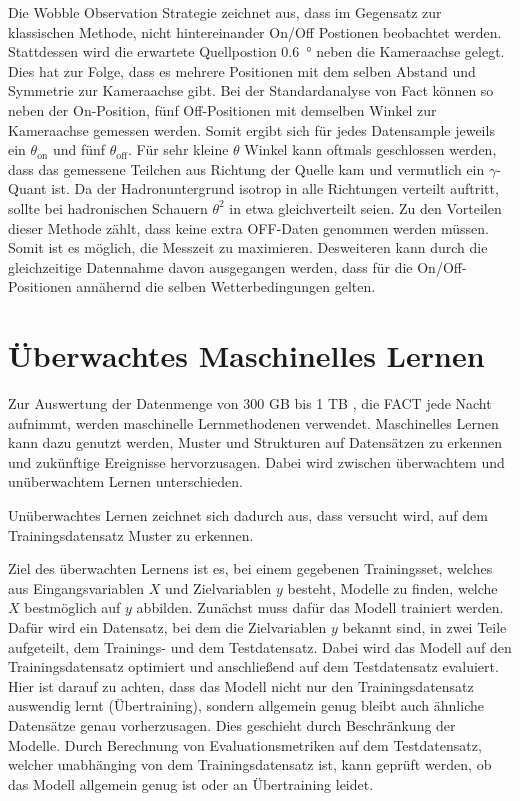 Die Wobble Observation Strategie zeichnet aus, dass im Gegensatz zur klassischen Methode, nicht hintereinander On/Off Postionen beobachtet werden. 
Stattdessen wird die erwartete Quellpostion \SI{0.6}{\degree} neben die Kameraachse gelegt. 
Dies hat zur Folge, dass es mehrere Positionen mit dem selben Abstand und Symmetrie zur Kameraachse gibt. 
Bei der Standardanalyse von Fact können so neben der On-Position, fünf Off-Positionen mit demselben Winkel zur Kameraachse gemessen werden. 
Somit ergibt sich für jedes Datensample jeweils ein $\theta_\text{on}$ und fünf $\theta_\text{off}$. 
Für sehr kleine $\theta$ Winkel kann oftmals geschlossen werden, dass das gemessene Teilchen aus Richtung der Quelle kam und vermutlich ein $\gamma$-Quant ist. 
Da der Hadronuntergrund isotrop in alle Richtungen verteilt auftritt, sollte bei hadronischen Schauern $\theta^{2}$ in etwa gleichverteilt seien. 
Zu den Vorteilen dieser Methode zählt, dass keine extra OFF-Daten genommen werden müssen. 
Somit ist es möglich, die Messzeit zu maximieren. 
Desweiteren kann durch die gleichzeitige Datennahme davon ausgegangen werden, dass für die On/Off-Positionen annähernd die selben Wetterbedingungen gelten. 

\chapter{Überwachtes Maschinelles Lernen}
Zur Auswertung der Datenmenge von 300 GB bis 1 TB \cite{MaxNoethe}, die FACT jede Nacht aufnimmt, werden maschinelle Lernmethodenen verwendet. 
Maschinelles Lernen kann dazu genutzt werden, Muster und Strukturen auf Datensätzen zu erkennen und zukünftige Ereignisse hervorzusagen. 
Dabei wird zwischen überwachtem und unüberwachtem Lernen unterschieden.

Unüberwachtes Lernen zeichnet sich dadurch aus, dass versucht wird, auf dem Trainingsdatensatz Muster zu erkennen.  

Ziel des überwachten Lernens ist es, bei einem gegebenen Trainingsset, welches aus Eingangsvariablen $X$ und Zielvariablen $y$ besteht, Modelle zu finden, welche $X$ bestmöglich auf $y$ abbilden. 
Zunächst muss dafür das Modell trainiert werden. 
Dafür wird ein Datensatz, bei dem die Zielvariablen $y$ bekannt sind, in zwei Teile aufgeteilt, dem Trainings- und dem Testdatensatz. 
Dabei wird das Modell auf den Trainingsdatensatz optimiert und anschließend auf dem Testdatensatz evaluiert. 
Hier ist darauf zu achten, dass das Modell nicht nur den Trainingsdatensatz auswendig lernt (Übertraining), sondern allgemein genug bleibt auch ähnliche Datensätze genau vorherzusagen. 
Dies geschieht durch Beschränkung der Modelle. 
Durch Berechnung von Evaluationsmetriken auf dem Testdatensatz, welcher unabhänging von dem Trainingsdatensatz ist, kann geprüft werden, ob das Modell allgemein genug ist oder an Übertraining leidet.
